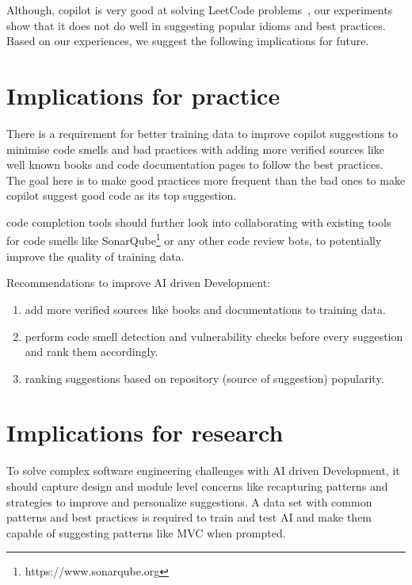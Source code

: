 \label{chapter:eval}

Although, copilot is very good at solving LeetCode problems~\cite{empirical_eval}, our experiments show that it does not do well in suggesting popular idioms and best practices. Based on our experiences, we suggest the following implications for future.

\section{Implications for practice}
There is a requirement for better training data to improve copilot suggestions to minimise code smells and bad practices with adding more verified sources like well known books and code documentation pages to follow the best practices. The goal here is to make good practices more frequent than the bad ones to make copilot suggest good code as its top suggestion.

code completion tools should further look into collaborating with existing tools for code smells like SonarQube\footnote{https://www.sonarqube.org} or any other code review bots, to potentially improve the quality of training data.


Recommendations to improve AI driven Development:
\begin{enumerate}
    \item add more verified sources like books and documentations to training data.
    \item perform code smell detection and vulnerability checks before every suggestion and rank them accordingly.
    \item ranking suggestions based on repository (source of suggestion) popularity.
\end{enumerate}

\section{Implications for research}
To solve complex software engineering challenges with AI driven Development, it should capture design and module level concerns like recapturing patterns and strategies to improve and personalize suggestions. A data set with common patterns and best practices is required to train and test AI and make them capable of suggesting patterns like MVC when prompted.

